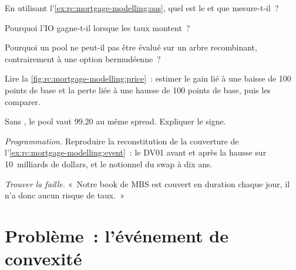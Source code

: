 \begin{exercise}[$\star$]\label{exo:rc:mortgage-modelling:2}
En utilisant l'\cref{ex:rc:mortgage-modelling:oas}, quel est le  et que
mesure-t-il~?
\end{exercise}

\begin{exercise}[$\star$]\label{exo:rc:mortgage-modelling:3}
Pourquoi l'IO gagne-t-il lorsque les taux montent~?
\end{exercise}

\begin{exercise}[$\star\star$]\label{exo:rc:mortgage-modelling:4}
Pourquoi un pool ne peut-il pas être évalué sur un arbre recombinant, contrairement à une option bermudéenne~?
\end{exercise}

\begin{exercise}[$\star\star$]\label{exo:rc:mortgage-modelling:5}
Lire la \cref{fig:rc:mortgage-modelling:price}~: estimer le gain lié à une baisse de 100 points de base
et la perte liée à une hausse de 100 points de base, puis les comparer.
\end{exercise}

\begin{exercise}[$\star\star$]\label{exo:rc:mortgage-modelling:6}
Sans , le pool vaut 99.20 au même spread. Expliquer le signe.
\end{exercise}

\begin{exercise}[$\star\star\star$]\label{exo:rc:mortgage-modelling:7}
\emph{Programmation.} Reproduire la reconstitution de la couverture de l'\cref{ex:rc:mortgage-modelling:event}~: le DV01
avant et après la hausse sur 10~milliards de dollars, et le notionnel du swap à dix ans.
\end{exercise}

\begin{exercise}[$\star\star\star$]\label{exo:rc:mortgage-modelling:8}
\emph{Trouver la faille.} «~Notre book de MBS est couvert en duration chaque jour, il n'a donc aucun risque de taux.~»
\end{exercise}

\section{Problème~: l'événement de convexité}

